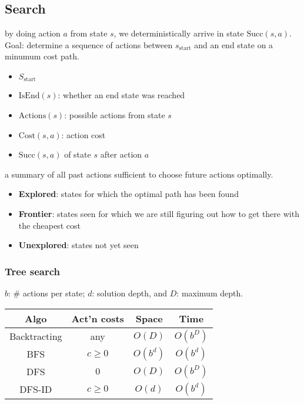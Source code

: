 \subsection{Search}

 by doing action $a$ from state $s$, we deterministically
arrive in state $\text{Succ}(s,a)$. Goal: determine a sequence of actions
between $s_{\text{start}}$ and an end state on a minumum cost path.
\begin{itemize}
    \item $S_\text{start}$
    \item $\text{IsEnd}(s)$: whether an end state was reached
    \item $\text{Actions}(s)$: possible actions from state $s$
    \item $\text{Cost}(s,a)$: action cost
    \item $\text{Succ}(s,a)$ of state $s$ after action $a$
\end{itemize}

 a summary of all past actions sufficient to choose future actions optimally.

\begin{itemize}
    \item \textbf{Explored}: states for which the optimal path has been found
    \item \textbf{Frontier}: states seen for which we are still figuring out how to get there with the cheapest cost
    \item \textbf{Unexplored}: states not yet seen
\end{itemize}

\subsubsection{Tree search}

 $b$: \# actions per state; $d$: solution depth, and $D$:
maximum depth.
\begin{tabular}{|c|c|c|c|} 
    \hline
    \textbf{Algo}  & \textbf{Act'n costs} & \textbf{Space} & \textbf{Time} \\
    \hline
    Backtracting & any & $O(D)$ & $O(b^D)$ \\ 
    \hline
    BFS & $c \ge 0$ & $O(b^d)$ & $O(b^d)$ \\
    \hline
    DFS & $0$ & $O(D)$ & $O(b^D)$ \\
    \hline
    DFS-ID & $c \ge 0$ & $O(d)$ & $O(b^d)$ \\
    \hline
\end{tabular}

